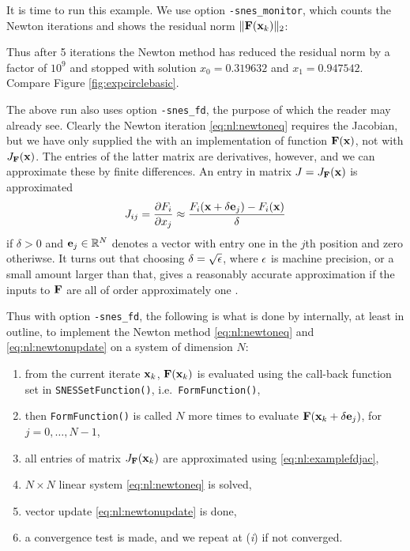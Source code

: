 It is time to run this example.  We use option \texttt{-snes\_monitor}, which counts the Newton iterations and shows the residual norm $\|\mathbf{F}(\mathbf{x}_k)\|_2$:
Thus after 5 iterations the Newton method has reduced the residual norm by a factor of $10^9$ and stopped with solution $x_0=0.319632$ and $x_1=0.947542$.  Compare Figure \ref{fig:expcirclebasic}.

The above run also uses option \texttt{-snes\_fd}, the purpose of which the reader may already see.  Clearly the Newton iteration \eqref{eq:nl:newtoneq} requires the Jacobian, but we have only supplied the \pSNES with an implementation of function $\mathbf{F}(\mathbf{x})$, not with $J_{\mathbf{F}}(\mathbf{x})$.  The entries of the latter matrix are derivatives, however, and we can approximate these by finite differences.  An entry in matrix $J=J_{\mathbf{F}}(\mathbf{x})$ is approximated
\begin{equation}
J_{ij} = \frac{\partial F_i}{\partial x_j} \approx \frac{F_i(\mathbf{x}+\delta \mathbf{e}_j) - F_i(\mathbf{x})}{\delta}  \label{eq:nl:examplefdjac}
\end{equation}
if $\delta>0$ and $\mathbf{e}_j\in \mathbb{R}^N$ denotes a vector with entry one in the $j$th position and zero otheriwse.  It turns out that choosing $\delta = \sqrt{\epsilon}$, where $\epsilon$ is machine precision, or a small amount larger than that, gives a reasonably accurate approximation if the inputs to $\mathbf{F}$ are all of order approximately one \citep{Kelley2003}.

Thus with option \texttt{-snes\_fd}, the following is what is done by \pSNES internally, at least in outline, to implement the Newton method \eqref{eq:nl:newtoneq} and \eqref{eq:nl:newtonupdate} on a system of dimension $N$:
\renewcommand{\labelenumi}{(\emph{\roman{enumi}})}
\begin{enumerate}
\item from the current iterate $\mathbf{x}_k$, $\mathbf{F}(\mathbf{x}_k)$ is evaluated using the call-back function set in \texttt{SNESSetFunction()}, i.e.~\texttt{FormFunction()},
\item then \texttt{FormFunction()} is called $N$ more times to evaluate $\mathbf{F}(\mathbf{x}_k+\delta \mathbf{e}_j)$, for $j=0,\dots,N-1$,
\item all entries of matrix $J_{\mathbf{F}}(\mathbf{x}_k)$ are approximated using \eqref{eq:nl:examplefdjac},
\item $N\times N$ linear system \eqref{eq:nl:newtoneq} is solved,
\item vector update \eqref{eq:nl:newtonupdate} is done,
\item a convergence test is made, and we repeat at (\emph{i}) if not converged.
\end{enumerate}

